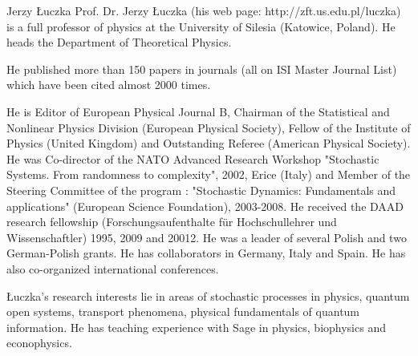 
\begin{participant}[type=PI,PM=12,salary=2500,gender=male]{Jerzy Łuczka}
Prof. Dr. Jerzy Łuczka (his web page: http://zft.us.edu.pl/luczka) is
a full professor of physics at the University of Silesia (Katowice,
Poland). He heads the Department of Theoretical Physics.

He published more than 150 papers in journals (all on ISI Master
Journal List) which have been cited almost 2000 times.

He is Editor of European Physical Journal B, Chairman of the
Statistical and Nonlinear Physics Division (European Physical
Society), Fellow of the Institute of Physics (United Kingdom) and
Outstanding Referee (American Physical Society). He was Co-director of
the NATO Advanced Research Workshop "Stochastic Systems. From
randomness to complexity", 2002, Erice (Italy) and Member of the
Steering Committee of the program : "Stochastic Dynamics: Fundamentals
and applications" (European Science Foundation), 2003-2008.  He
received the DAAD research fellowship (Forschungsaufenthalte für
Hochschullehrer und Wissenschaftler) 1995, 2009 and 20012. He was a
leader of several Polish and two German-Polish grants. He has
collaborators in Germany, Italy and Spain. He has also co-organized
international conferences.

Łuczka’s research interests lie in areas of stochastic processes in
physics, quantum open systems, transport phenomena, physical
fundamentals of quantum information. He has teaching experience with
Sage in physics, biophysics and econophysics.


\end{participant}

